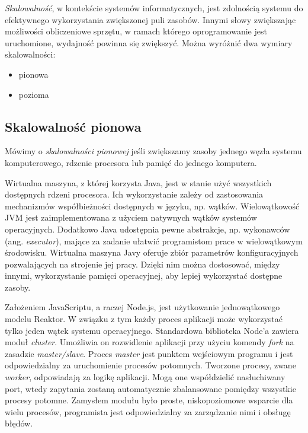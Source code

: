 \documentclass[12pt,twoside]{article}
\providecommand{\tightlist}{  \setlength{\itemsep}{0pt}\setlength{\parskip}{0pt}}
\begin{document}
\emph{Skalowalność}, w kontekście systemów informatycznych, jest
zdolnością systemu do efektywnego wykorzystania zwiększonej puli
zasobów. Innymi słowy zwiększając możliwości obliczeniowe sprzętu, w
ramach którego oprogramowanie jest uruchomione, wydajność powinna się
zwiększyć. Można wyróżnić dwa wymiary
skalowalności\autocite{elrewini2005advanced}:

\begin{itemize}
\tightlist
\item
  pionowa
\item
  pozioma
\end{itemize}

\subsection{Skalowalność pionowa}\label{skalowalnoux15bux107-pionowa}

Mówimy o \emph{skalowalności pionowej} jeśli zwiększamy zasoby jednego
węzła systemu komputerowego, rdzenie procesora lub pamięć do jednego
komputera.\autocite{elrewini2005advanced}

Wirtualna maszyna, z której korzysta Java, jest w stanie użyć wszystkich
dostępnych rdzeni procesora. Ich wykorzystanie zależy od zastosowania
mechanizmów współbieżności dostępnych w języku, np. wątków.
Wielowątkowość JVM jest zaimplementowana z użyciem natywnych wątków
systemów operacyjnych. Dodatkowo Java udostępnia pewne abstrakcje, np.
wykonawców (ang. \emph{executor}), mające za zadanie ułatwić
programistom prace w wielowątkowym środowisku. Wirtualna maszyna Javy
oferuje zbiór parametrów konfiguracyjnych pozwalających na strojenie jej
pracy. Dzięki nim można dostosować, między innymi, wykorzystanie pamięci
operacyjnej, aby lepiej wykorzystać dostępne zasoby.

Założeniem JavaScriptu, a raczej Node.js, jest użytkowanie
jednowątkowego modelu Reaktor. W związku z tym każdy proces aplikacji
może wykorzystać tylko jeden wątek systemu operacyjnego. Standardowa
biblioteka Node'a zawiera moduł \emph{cluster}. Umożliwia on rozwidlenie
aplikacji przy użyciu komendy \emph{fork} na zasadzie
\emph{master/slave}. Proces \emph{master} jest punktem wejściowym
programu i jest odpowiedzialny za uruchomienie procesów potomnych.
Tworzone procesy, zwane \emph{worker}, odpowiadają za logikę aplikacji.
Mogą one współdzielić nasłuchiwany port, wtedy zapytania zostaną
automatycznie zbalansowane pomiędzy wszystkie procesy potomne. Zamysłem
modułu było proste, niskopoziomowe wsparcie dla wielu procesów,
programista jest odpowiedzialny za zarządzanie nimi i obsługę błędów.
\end{document}
